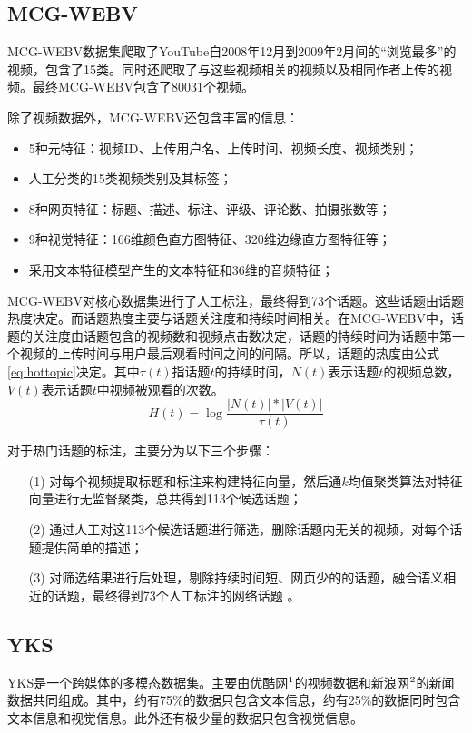 \subsection{MCG-WEBV}
MCG-WEBV数据集爬取了YouTube自2008年12月到2009年2月间的“浏览最多”的视频，包含了15类。同时还爬取了与这些视频相关的视频以及相同作者上传的视频。最终MCG-WEBV包含了80031个视频。

除了视频数据外，MCG-WEBV还包含丰富的信息：
\begin{itemize}
	\item 5种元特征：视频ID、上传用户名、上传时间、视频长度、视频类别；
	\item 人工分类的15类视频类别及其标签；
	\item 8种网页特征：标题、描述、标注、评级、评论数、拍摄张数等；
	\item 9种视觉特征：166维颜色直方图特征、320维边缘直方图特征等；
	\item 采用文本特征模型产生的文本特征和36维的音频特征；
\end{itemize}

MCG-WEBV对核心数据集进行了人工标注，最终得到73个话题。这些话题由话题热度决定。而话题热度主要与话题关注度和持续时间相关。在MCG-WEBV中，话题的关注度由话题包含的视频数和视频点击数决定，话题的持续时间为话题中第一个视频的上传时间与用户最后观看时间之间的间隔。所以，话题的热度由公式\ref{eq:hottopic}决定。其中$\tau(t)$指话题$t$的持续时间，$N(t)$表示话题$t$的视频总数，$V(t)$表示话题$t$中视频被观看的次数。
\begin{equation}\label{eq:hottopic}
H(t) = \log\frac{|N(t)|*|V(t)|}{\tau(t)}
\end{equation}

对于热门话题的标注，主要分为以下三个步骤：
\begin{enumerate}
    \item[(1)] 对每个视频提取标题和标注来构建特征向量，然后通$k$均值聚类算法对特征向量进行无监督聚类，总共得到113个候选话题；
    \item[(2)] 通过人工对这113个候选话题进行筛选，删除话题内无关的视频，对每个话题提供简单的描述；
    \item[(3)] 对筛选结果进行后处理，剔除持续时间短、网页少的的话题，融合语义相近的话题，最终得到73个人工标注的网络话题 。
\end{enumerate}

\subsection{YKS}

YKS是一个跨媒体的多模态数据集。主要由优酷网$\footnote{https://www.youku.com/}$的视频数据和新浪网$\footnote{https://www.sina.com.cn/}$的新闻数据共同组成。其中，约有75\%的数据只包含文本信息，约有25\%的数据同时包含文本信息和视觉信息。此外还有极少量的数据只包含视觉信息。

